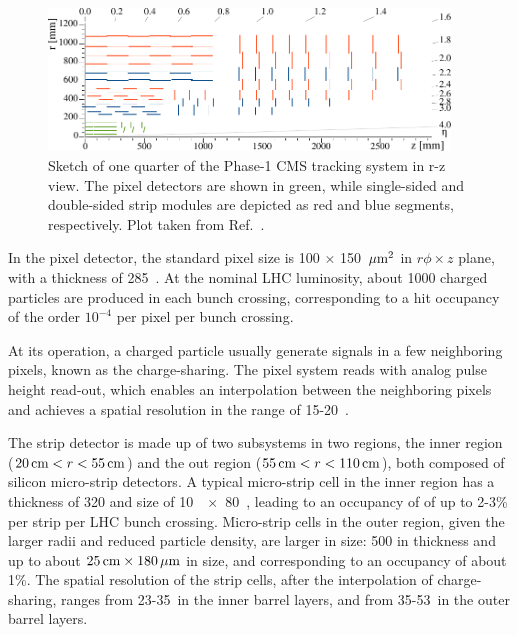 \begin{figure}[!htb]
    \centering
    \captionsetup{justification=justified}
    \includegraphics[width=0.95\textwidth]{pics/LHC_CMS/Phase1_Tracker.pdf}
    \caption{Sketch of one quarter of the Phase-1 CMS tracking system in r-z view.
             The pixel detectors are shown in green, 
             while single-sided and double-sided strip modules are depicted as red and blue segments, respectively.
             Plot taken from Ref.~\cite{phase1_tracker}.}
    \label{fig:cms_tracker}
\end{figure}

In the pixel detector, the standard pixel size is 100 $\times$ 150 $\,\mu\text{m}^{2}$ in $r\phi \times z$ plane, with a thickness of 285~\mum.
At the nominal LHC luminosity, about 1000 charged particles are produced in each bunch crossing, 
corresponding to a hit occupancy of the order $10^{-4}$ per pixel per bunch crossing.

At its operation, a charged particle usually generate signals in a few neighboring pixels, known as the charge-sharing.
The pixel system reads with analog pulse height read-out, which enables an interpolation between the neighboring pixels
and achieves a spatial resolution in the range of 15-20~\mum.

The strip detector is made up of two subsystems in two regions, the inner region ($20 \,\text{cm} < r < 55 \,\text{cm}$) 
and the out region ($55 \,\text{cm} < r < 110 \,\text{cm}$), both composed of silicon micro-strip detectors. 
A typical micro-strip cell in the inner region has a thickness of 320 \mum and size of 10~\cm~$\times$~80~\mum,
leading to an occupancy of of up to 2-3\% per strip per LHC bunch crossing.
Micro-strip cells in the outer region, given the larger radii and reduced particle density, are larger in size:
500 \mum in thickness and up to about $25 \,\text{cm} \times 180 \,\mu\text{m}$ in size,
and corresponding to an occupancy of about 1\%.
The spatial resolution of the strip cells, after the interpolation of charge-sharing, 
ranges from 23-35~\mum in the inner barrel layers, and from 35-53~\mum in the outer barrel layers.  

